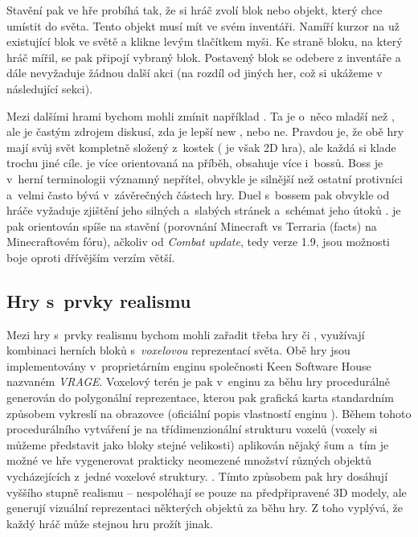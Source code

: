 \FloatBarrier

Stavění pak ve hře probíhá tak, že si hráč zvolí blok nebo objekt, který chce umístit do světa. Tento objekt musí mít ve svém inventáři. Namíří kurzor na už existující blok ve světě a klikne levým tlačítkem myši. Ke straně bloku, na který hráč mířil, se pak připojí vybraný blok. Postavený blok se odebere z inventáře a dále nevyžaduje žádnou další akci (na rozdíl od jiných her, což si ukážeme v následující sekci).


Mezi dalšími hrami bychom mohli zmínit například \TE{}. Ta je o~něco mladší než \MC{}, ale je častým zdrojem diskusí, zda je lepší new \MC{}, nebo ne. Pravdou je, že obě hry mají svůj svět kompletně složený z~kostek (\TE{} je však 2D hra), ale každá si klade trochu jiné cíle. \TE{} je více orientovaná na příběh, obsahuje více \NPC{} i~bossů. Boss je v~herní terminologii významný nepřítel, obvykle je silnější než ostatní protivníci a~velmi často bývá v~závěrečných částech hry. Duel s~bossem pak obvykle od hráče vyžaduje zjištění jeho silných a~slabých stránek a~schémat jeho útoků \citep{intro_boss}. \MC{} je pak orientován spíše na stavění (porovnání Minecraft vs Terraria (facts) \citep{mc_te_comparsion} na Minecraftovém fóru), ačkoliv od \textit{Combat update}, tedy verze 1.9, jsou možnosti boje oproti dřívějším verzím větší.  


\subsection{Hry s~prvky realismu}

Mezi hry s~prvky realismu bychom mohli zařadit třeba hry \SE{} či \ME{}, využívají kombinaci herních bloků s~\textit{voxelovou} reprezentací světa. Obě hry jsou implementovány v~proprietárním enginu společnosti Keen Software House nazvaném \textit{VRAGE}\texttrademark{}. Voxelový terén je pak v~enginu za běhu hry procedurálně generován do polygonální reprezentace, kterou pak grafická karta standardním způsobem vykreslí na obrazovce (oficiální popis vlastností enginu \citep{vrage}). Během tohoto procedurálního vytváření je na třídimenzionální strukturu voxelů (voxely si můžeme představit jako bloky stejné velikosti) aplikován nějaký šum a~tím je možné ve hře vygenerovat prakticky neomezené množství různých objektů vycházejících z~jedné voxelové struktury.  \citep{rosa_blog}. Tímto způsobem pak hry dosáhují vyššího stupně realismu -- nespoléhají se pouze na předpřipravené 3D modely, ale generují vizuální reprezentaci některých objektů za běhu hry. Z toho vyplývá, že každý hráč může stejnou hru prožít jinak. 

